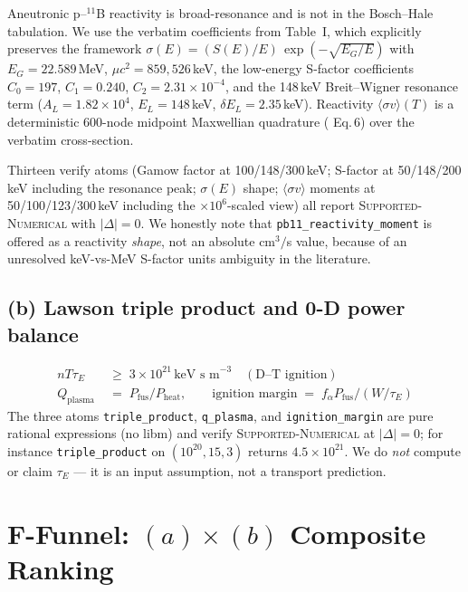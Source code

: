 \documentclass[11pt,a4paper]{article}
\begin{document}
Aneutronic p--$^{11}$B reactivity is broad-resonance and is not in the
Bosch--Hale tabulation. We use the verbatim coefficients from
\citet{tentori2023pb11} Table~I, which explicitly preserves the
\citet{nevinsswain2000} framework
$\sigma(E) = (S(E)/E)\,\exp(-\sqrt{E_G/E})$ with $E_G = 22.589$\,MeV,
$\mu c^2 = 859{,}526$\,keV, the low-energy S-factor coefficients
$C_0=197$, $C_1=0.240$, $C_2=2.31\!\times\!10^{-4}$, and the
148\,keV Breit--Wigner resonance term ($A_L=1.82\!\times\!10^4$,
$E_L=148$\,keV, $\delta E_L=2.35$\,keV). Reactivity
$\langle\sigma v\rangle(T)$ is a deterministic 600-node midpoint
Maxwellian quadrature (\citep{tentori2023pb11} Eq.\,6) over the
verbatim cross-section.

Thirteen verify atoms (Gamow factor at 100/148/300\,keV; S-factor at
50/148/200\,keV including the resonance peak; $\sigma(E)$ shape;
$\langle\sigma v\rangle$ moments at 50/100/123/300\,keV including the
$\times 10^{6}$-scaled view) all report \textsc{Supported-Numerical}
with $|\Delta|=0$. We honestly note that
\verb|pb11_reactivity_moment| is offered as a reactivity
\emph{shape}, not an absolute cm$^{3}/$s value, because of an
unresolved keV-vs-MeV S-factor units ambiguity in the literature.

\subsection{(b) Lawson triple product and 0-D power balance}

\begin{align}
n T \tau_{\!E} \;&\ge\; 3\times10^{21}\,\text{keV s m}^{-3}
\quad(\text{D--T ignition})\\
Q_{\text{plasma}} \;&=\; P_{\text{fus}}/P_{\text{heat}},\qquad
\text{ignition margin} \;=\; f_\alpha P_{\text{fus}}/(W/\tau_{\!E})
\label{eq:lawson}
\end{align}
The three atoms \verb|triple_product|, \verb|q_plasma|, and
\verb|ignition_margin| are pure rational expressions (no libm) and
verify \textsc{Supported-Numerical} at $|\Delta|=0$; for instance
\verb|triple_product| on $(10^{20}, 15, 3)$ returns
$4.5\times10^{21}$. We do \emph{not} compute or claim $\tau_{\!E}$ ---
it is an input assumption, not a transport prediction.

\section{F-Funnel: $(a)\times(b)$ Composite Ranking}
\label{sec:funnel}
\end{document}
